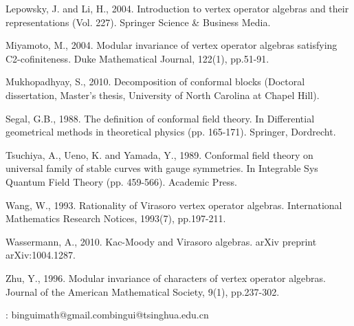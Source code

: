 \documentclass[12pt,a4paper,notitlepage]{article}
\theoremstyle{definition}
\theoremstyle{plain}
\numberwithin{equation}{section}
\begin{document}
\begin{thebibliography}{999999}
Lepowsky, J. and Li, H., 2004. Introduction to vertex operator algebras and their representations (Vol. 227). Springer Science \& Business Media.

Miyamoto, M., 2004. Modular invariance of vertex operator algebras satisfying C2-cofiniteness. Duke Mathematical Journal, 122(1), pp.51-91.


Mukhopadhyay, S., 2010. Decomposition of conformal blocks (Doctoral dissertation, Master’s thesis, University of North Carolina at Chapel Hill).

Segal, G.B., 1988. The definition of conformal field theory. In Differential geometrical methods in theoretical physics (pp. 165-171). Springer, Dordrecht.

Tsuchiya, A., Ueno, K. and Yamada, Y., 1989. Conformal field theory on universal family of stable curves with gauge symmetries. In Integrable Sys Quantum Field Theory (pp. 459-566). Academic Press.





Wang, W., 1993. Rationality of Virasoro vertex operator algebras. International Mathematics Research Notices, 1993(7), pp.197-211.



Wassermann, A., 2010. Kac-Moody and Virasoro algebras. arXiv preprint arXiv:1004.1287.

Zhu, Y., 1996. Modular invariance of characters of vertex operator algebras. Journal of the American Mathematical Society, 9(1), pp.237-302.




		
		
\end{thebibliography}


: binguimath@gmail.com\qquad bingui@tsinghua.edu.cn
\end{document}
